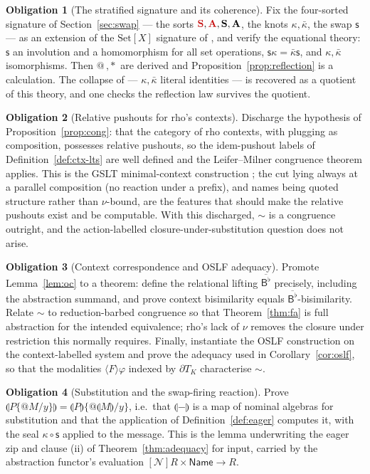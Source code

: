 \documentclass[11pt]{article}
\makeatletter
\newcommand{\rd}[1]{\textcolor{redcopy}{#1}}
\newcommand{\RS}{\rd{\mathbf{S}}}              %
\newcommand{\RA}{\rd{\mathbf{A}}}              %
\newcommand{\BS}{\mathbf{S}}                   %
\newcommand{\BA}{\mathbf{A}}                   %
\newcommand{\swp}{\mathsf{s}}                  %
\newcommand{\kt}{\kappa}                       %
\newcommand{\ktb}{\bar\kappa}                  %
\newcommand{\drp}[1]{{\ast}#1}
\newcommand{\quo}[1]{@#1}
\newcommand{\nset}[1]{[\mathcal{N}]#1}
\newcommand{\Name}{\mathsf{Name}}
\newcommand{\Set}{\mathrm{Set}}
\newcommand{\B}{\mathsf{B}}
\newcommand{\sem}[1]{\llparenthesis #1\rrparenthesis}   %
\newcommand{\bis}{\sim}
\newcommand{\DK}{\partial T_{K}}               %
\theoremstyle{plain}
\theoremstyle{definition}
\newtheorem{obligation}{Obligation}
\makeatother
\begin{document}
\begin{obligation}[The stratified signature and its coherence]\label{ob:strat}
Fix the four-sorted signature of Section~\ref{sec:swap} --- the sorts
$\RS,\RA,\BS,\BA$, the knots $\kt,\ktb$, the swap $\swp$ --- as an extension of the
$\Set[X]$ signature of \cite{knot}, and verify the equational theory: $\swp$ an
involution and a homomorphism for all set operations, $\swp\kt=\ktb\swp$, and
$\kt,\ktb$ isomorphisms. Then $\quo{\,},\drp{\,}$ are derived and
Proposition~\ref{prop:reflection} is a calculation. The collapse of \cite{knot}
--- $\kt,\ktb$ literal identities --- is recovered as a quotient of this theory,
and one checks the reflection law survives the quotient.
\end{obligation}

\begin{obligation}[Relative pushouts for rho's contexts]\label{ob:rpo}
Discharge the hypothesis of Proposition~\ref{prop:cong}: that the category of rho
contexts, with plugging as composition, possesses relative pushouts, so the
idem-pushout labels of Definition~\ref{def:ctx-lts} are well defined and the
Leifer--Milner congruence theorem applies. This is the GSLT minimal-context
construction \cite{meredithwells}; the cut lying always at a parallel composition
(no reaction under a prefix), and names being quoted structure rather than
$\nu$-bound, are the features that should make the relative pushouts exist and be
computable. With this discharged, $\bis$ is a congruence outright, and the
action-labelled closure-under-substitution question does not arise.
\end{obligation}

\begin{obligation}[Context correspondence and OSLF adequacy]\label{ob:oc}
Promote Lemma~\ref{lem:oc} to a theorem: define the relational lifting
$\overline{\B^{\flat}}$ precisely, including the abstraction summand, and prove
context bisimilarity equals $\overline{\B^{\flat}}$-bisimilarity. Relate $\bis$ to
reduction-barbed congruence so that Theorem~\ref{thm:fa} is full abstraction for
the intended equivalence; rho's lack of $\nu$ removes the closure under restriction
this normally requires. Finally, instantiate the OSLF construction on the
context-labelled system and prove the adequacy used in Corollary~\ref{cor:oslf}, so
that the modalities $\langle F\rangle\varphi$ indexed by $\DK$ characterise $\bis$.
\end{obligation}

\begin{obligation}[Substitution and the swap-firing reaction]\label{ob:subst}
Prove $\sem{P\{\quo M/y\}}=\sem P\{\quo{\sem M}/y\}$, i.e.\ that $\sem{-}$ is a map
of nominal algebras for substitution and that the application of
Definition~\ref{def:eager} computes it, with the seal $\kt\circ\swp$ applied to the
message. This is the lemma underwriting the eager zip and clause (ii) of
Theorem~\ref{thm:adequacy} for input, carried by the abstraction functor's
evaluation $\nset R\times\Name\to R$.
\end{obligation}
\end{document}
